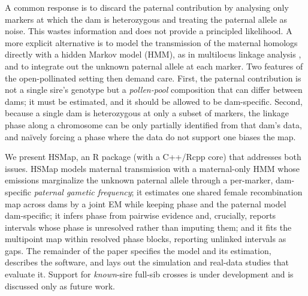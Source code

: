 \documentclass[11pt]{article}
\begin{document}
A common response is to discard the paternal contribution by analysing only markers at
which the dam is heterozygous and treating the paternal allele as noise. This wastes
information and does not provide a principled likelihood. A more explicit alternative is
to model the transmission of the maternal homologs directly with a hidden Markov model
(HMM), as in multilocus linkage analysis \citep{LanderGreen1987}, and to integrate out
the unknown paternal allele at each marker.
Two features of the open-pollinated setting then demand care. First, the paternal
contribution is not a single sire's genotype but a \emph{pollen-pool} composition that
can differ between dams; it must be estimated, and it should be allowed to be
dam-specific. Second, because a single dam is heterozygous at only a subset of markers,
the linkage phase along a chromosome can be only partially identified from that dam's
data, and na\"ively forcing a phase where the data do not support one biases the map.

We present \textsf{HSMap}, an \textsf{R} package (with a \textsf{C++}/\textsf{Rcpp}
core) that addresses both issues. \textsf{HSMap} models maternal transmission with a
maternal-only HMM whose emissions marginalize the unknown paternal allele through a
per-marker, dam-specific \emph{paternal gametic frequency}; it estimates one shared
female recombination map across dams by a joint EM while keeping phase and the paternal
model dam-specific; it infers phase from pairwise evidence and, crucially, reports
intervals whose phase is unresolved rather than imputing them; and it fits the
multipoint map within resolved phase blocks, reporting unlinked intervals as gaps. The
remainder of the paper specifies the model and its estimation, describes the software,
and lays out the simulation and real-data studies that evaluate it. Support for
\emph{known}-sire full-sib crosses is under development and is discussed only as future
work.
\end{document}
